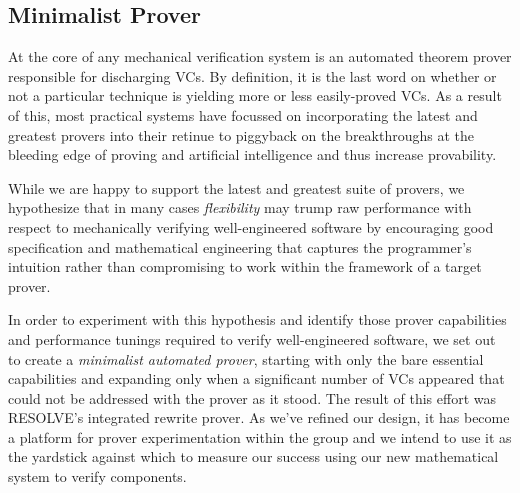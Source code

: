 \subsection{Minimalist Prover\label{sec:researchProver}}
At the core of any mechanical verification system is an automated theorem prover responsible for discharging VCs.  By definition, it is the last word on whether or not a particular technique is yielding more or less easily-proved VCs.  As a result of this, most practical systems have focussed on incorporating the latest and greatest provers into their retinue to piggyback on the breakthroughs at the bleeding edge of proving and artificial intelligence and thus increase provability.

While we are happy to support the latest and greatest suite of provers, we hypothesize that in many cases \emph{flexibility} may trump raw performance with respect to mechanically verifying well-engineered software by encouraging good specification and mathematical engineering that captures the programmer's intuition rather than compromising to work within the framework of a target prover.

In order to experiment with this hypothesis and identify those prover capabilities and performance tunings required to verify well-engineered software, we set out to create a \emph{minimalist automated prover}, starting with only the bare essential capabilities and expanding only when a significant number of VCs appeared that could not be addressed with the prover as it stood.  The result of this effort was RESOLVE's integrated rewrite prover.  As we've refined our design, it has become a platform for prover experimentation within the group and we intend to use it as the yardstick against which to measure our success using our new mathematical system to verify components.


